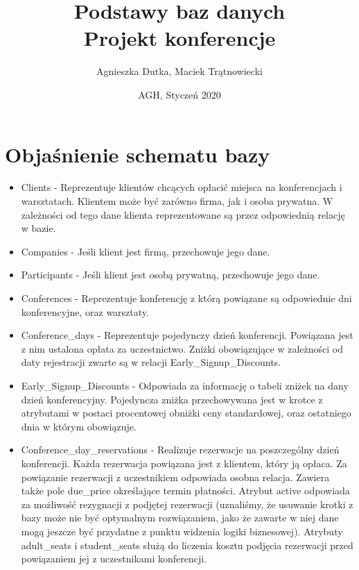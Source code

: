 \documentclass{article}
\title{Podstawy baz danych\\ Projekt konferencje}
\author{Agnieszka Dutka, Maciek Trątnowiecki}
\date{AGH, Styczeń 2020}
\begin{document}
\maketitle
\section{Objaśnienie schematu bazy}
        \begin{itemize}
            \item Clients - Reprezentuje klientów chcących opłacić miejsca na konferencjach i warsztatach. Klientem może być zarówno firma, jak i osoba prywatna. W zależności od tego dane klienta reprezentowane są przez odpowiednią relację w bazie. 
            
            \item Companies - Jeśli klient jest firmą, przechowuje jego dane. 
            
            \item Participants - Jeśli klient jest osobą prywatną, przechowuje jego dane.
            
            \item Conferences - Reprezentuje konferencję z którą powiązane są odpowiednie dni konferencyjne, oraz warsztaty. 
            
            \item Conference\_days - Reprezentuje pojedynczy dzień konferencji. Powiązana jest z nim ustalona opłata za uczestnictwo. Zniżki obowiązujące w zależności od daty rejestracji zwarte są w relacji Early\_Signup\_Discounts. 
            
            \item Early\_Signup\_Discounts - Odpowiada za informację o tabeli zniżek na dany dzień konferencyjny. Pojedyncza zniżka przechowywana jest w krotce z atrybutami w postaci procentowej obniżki ceny standardowej, oraz ostatniego dnia w którym obowiązuje. 
            
            \item Conference\_day\_reservations - Realizuje rezerwacje na poszczególny dzień konferencji. Każda rezerwacja powiązana jest z klientem, który ją opłaca. Za powiązanie rezerwacji z uczestnikiem odpowiada osobna relacja. Zawiera także pole due\_price określające termin płatności. Atrybut active odpowiada za możliwość rezygnacji z podjętej rezerwacji (uznaliśmy, że usuwanie krotki z bazy może nie być optymalnym rozwiązaniem, jako że zawarte w niej dane mogą jeszcze być przydatne z punktu widzenia logiki biznesowej). Atrybuty adult\_seats i student\_seats służą do liczenia kosztu podjęcia rezerwacji przed powiązaniem jej z uczestnikami konferencji. 
            

\end{itemize}
\end{document}
